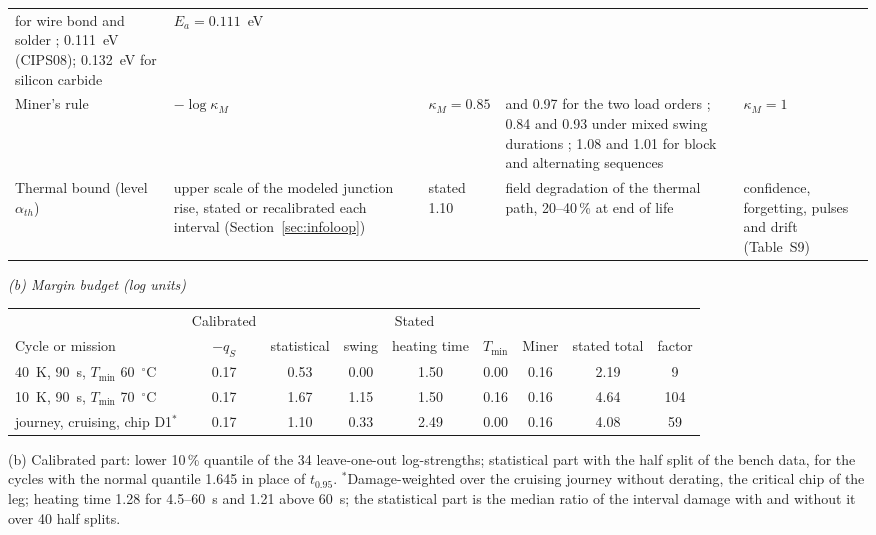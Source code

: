 \begin{table}[tbp]
\begin{tabularx}{\textwidth}{@{}>{\raggedright\arraybackslash}p{2.6cm}>{\raggedright\arraybackslash}p{3.5cm}
>{\raggedright\arraybackslash}p{2.0cm}>{\raggedright\arraybackslash}X>{\raggedright\arraybackslash}p{2.9cm}@{}}
for wire bond and solder \cite{scheuermann2018}; 0.111~eV (CIPS08); 0.132~eV for silicon carbide \cite{hoffmann2023} &
$E_a=0.111$~eV \\
\addlinespace
Miner's rule & $-\log\kappa_M$ & $\kappa_M=0.85$ & 0.85 and 0.97 for the two load orders \cite{hernes2021pcim};
0.84 and 0.93 under mixed swing durations \cite{choi2017apec}; 1.08 and 1.01 for block and alternating sequences
\cite{zeng2019} & $\kappa_M=1$ \\
\midrule
Thermal bound (level $\alpha_{th}$) & upper scale of the modeled junction rise, stated or recalibrated each interval
(Section~\ref{sec:infoloop}) & stated 1.10 & field degradation of the thermal path, 20--40\,\% at end of life &
confidence, forgetting, pulses and drift (Table~S9) \\
\bottomrule
\end{tabularx}

\medskip
\textit{(b) Margin budget (log units)}\\[2pt]
\begin{tabular*}{\textwidth}{@{\extracolsep{\fill}}lcccccccc@{}}
\toprule
& Calibrated & \multicolumn{5}{c}{Stated} & & \\
\cmidrule(lr){2-2}\cmidrule(lr){3-7}
Cycle or mission & $-q_S$ & statistical & swing & heating time & $T_{\min}$ & Miner & stated total & factor \\
\midrule
40~K, 90~s, $T_{\min}$ 60~$^\circ$C & 0.17 & 0.53 & 0.00 & 1.50 & 0.00 & 0.16 & 2.19 & 9 \\
10~K, 90~s, $T_{\min}$ 70~$^\circ$C & 0.17 & 1.67 & 1.15 & 1.50 & 0.16 & 0.16 & 4.64 & 104 \\
journey, cruising, chip D1$^{*}$ & 0.17 & 1.10 & 0.33 & 2.49 & 0.00 & 0.16 & 4.08 & 59 \\
\bottomrule
\end{tabular*}

\smallskip
\begin{minipage}{\textwidth}\scriptsize
(b) Calibrated part: lower 10\,\% quantile of the 34 leave-one-out log-strengths; statistical part with the half
split of the bench data, for the cycles with the normal quantile 1.645 in place of $t_{0.95}$. $^{*}$Damage-weighted over
the cruising journey without derating, the critical chip of the leg; heating time 1.28 for 4.5--60~s and 1.21 above
60~s; the statistical part is the median ratio of the interval damage with and without it over 40 half splits.
\end{minipage}
\end{table}
